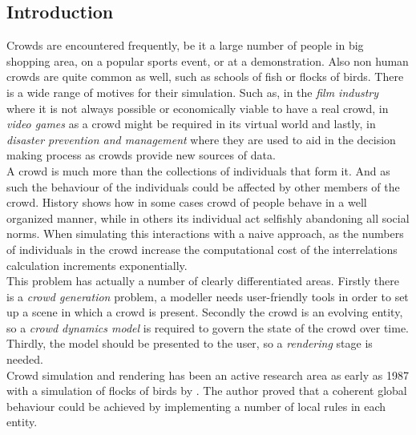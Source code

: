 \documentclass[6pt]{article} %
\begin{document}
\setcounter{page}{1} %
\columnsep 25.0pt %
\begin{multicols}{2} %

\section{Introduction}
\label{intro}

Crowds are encountered frequently, be it a large number of people in big shopping area, on a popular sports event, or at a demonstration.
Also non human crowds are quite common as well, such as schools of fish or flocks of birds.
There is a wide range of motives for their simulation.
Such as, in the \textit{film industry} where it is not always possible or economically viable to have a real crowd, in \textit{video games} as a crowd might be required in its virtual world and lastly, in \textit{disaster prevention and management} where they are used to aid in the decision making process as crowds provide new sources of data.\\

A crowd is much more than the collections of individuals that form it.
And as such the behaviour of the individuals could be affected by other members of the crowd.
History shows how in some cases crowd of people behave in a well organized manner, while in others its individual act selfishly abandoning all social norms.
When simulating this interactions with a naive approach, as the numbers of individuals in the crowd increase the computational cost of the interrelations calculation increments exponentially.\\

This problem has actually a number of clearly differentiated areas.
Firstly there is a \textit{crowd generation} problem, a modeller needs user-friendly tools in order to set up a scene in which a crowd is present.
Secondly the crowd is an evolving entity, so a \textit{crowd dynamics model} is required to govern the state of the crowd over time.
Thirdly, the model should be presented to the user, so a \textit{rendering} stage is needed.\\

Crowd simulation and rendering has been an active research area as early as 1987 with a simulation of flocks of birds by \cite{Reynolds1987}.
The author proved that a coherent global behaviour could be achieved by implementing a number of local rules in each entity.


\end{multicols}
\end{document}
